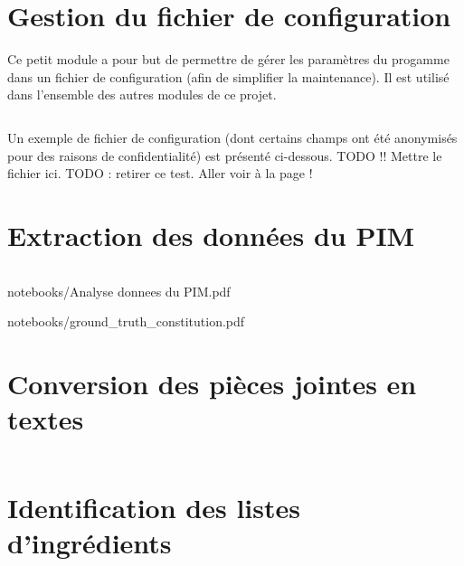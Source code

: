 \documentclass{report}
\begin{document}
        \section{Gestion du fichier de configuration}
        Ce petit module a pour but de permettre de gérer les paramètres du progamme dans un fichier de configuration (afin de simplifier la maintenance).
        Il est utilisé dans l'ensemble des autres modules de ce projet.
        \inputminted[fontsize=\scriptsize]{python}{../src/conf.py}
        Un exemple de fichier de configuration (dont certains champs ont été anonymisés pour des raisons de confidentialité) est présenté ci-dessous.
        TODO !! Mettre le fichier ici.
        TODO : retirer ce test. Aller voir à la page \pageref{lab:zobi} !

        \section{Extraction des données du PIM}
            \inputminted[fontsize=\scriptsize]{python}{../src/pimapi.py}
        
        
                    {notebooks/Analyse donnees du PIM.pdf}

        
        {notebooks/ground_truth_constitution.pdf}

        \section{Conversion des pièces jointes en textes}
            \inputminted[fontsize=\scriptsize]{python}{../src/pimpdf.py}
        
        \section{Identification des listes d'ingrédients}
            \inputminted[fontsize=\scriptsize]{python}{../src/pimest.py} 
 
\end{document}
